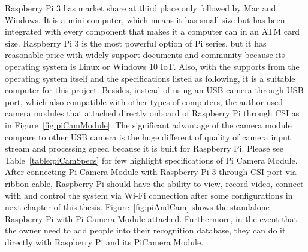Raspberry Pi 3 has market share at third place only followed by Mac and Windows. It is a mini computer, which means it has small size but has been integrated with every component that makes it a computer can in an ATM card size. Raspberry Pi 3 is the most powerful option of Pi series, but it has reasonable price with widely support documents and community because its operating system is Linux or Windows 10 IoT.  Also, with the supports from the operating system itself and the specifications listed as following, it is a suitable computer for this project. Besides, instead of using an USB camera through USB port, which also compatible with other types of computers, the author used camera modules that attached directly onboard of Raspberry Pi through CSI as in Figure~\ref{fig:piCamModule}. The significant advantage of the camera module compare to other USB camera is the huge different of quality of camera input stream and processing speed because it is built for Raspberry Pi. Please see Table~\ref{table:piCamSpecs} for few highlight specifications of Pi Camera Module. After connecting Pi Camera Module with Raspberry Pi 3 through CSI port via ribbon cable, Raspberry Pi should have the ability to view, record video, connect with and control the system via Wi-Fi connection after some configurations in next chapter of this thesis. Figure~\ref{fig:piAndCam} shows the standalone Raspberry Pi with Pi Camera Module attached. Furthermore, in the event that the owner need to add people into their recognition database, they can do it directly with Raspberry Pi and its PiCamera Module.


